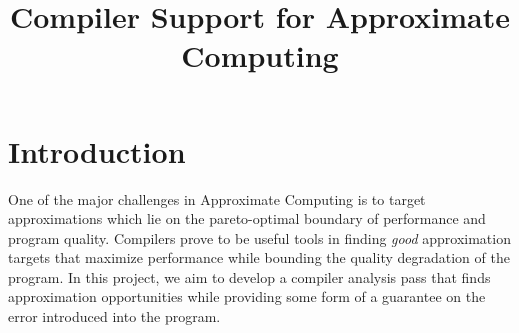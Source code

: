 \documentclass[12pt,conference]{IEEEtran}
\begin{document}
%
\title{Compiler Support for Approximate Computing}


\author{
\and
{}
}



\maketitle






%
\IEEEpeerreviewmaketitle



\section{Introduction}

One of the major challenges in Approximate Computing is 
to target approximations which lie on the pareto-optimal
boundary of performance and program quality. Compilers prove
to be useful tools in finding \emph{good} approximation 
targets that maximize performance while bounding the
quality degradation of the program. In this project, we aim
to develop a compiler analysis pass that finds approximation
opportunities while providing some form of a guarantee on the
error introduced into the program.
\end{document}
